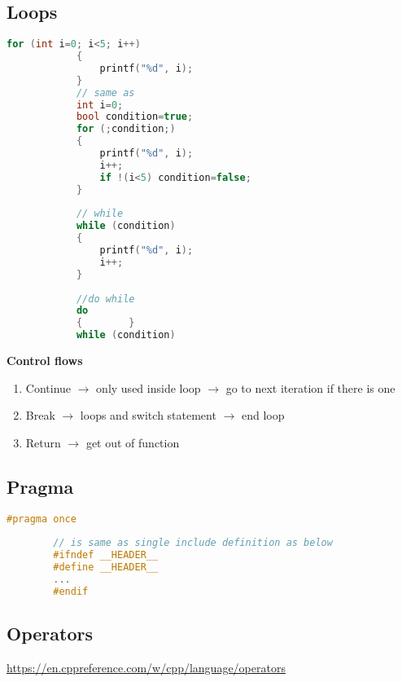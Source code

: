 \documentclass{article}
\begin{document}
        
    \subsection{Loops}
        \begin{lstlisting}[language=C++, caption= Loops example]
            for (int i=0; i<5; i++)
            {
                printf("%d", i);
            }
            // same as 
            int i=0; 
            bool condition=true;
            for (;condition;)
            {
                printf("%d", i);
                i++;
                if !(i<5) condition=false;
            }
            
            // while
            while (condition)
            {
                printf("%d", i);
                i++;
            }
            
            //do while
            do
            {        }
            while (condition)
        \end{lstlisting}
    
        \textbf{Control flows}
        \begin{enumerate}
            \item Continue $\rightarrow$ only used inside loop $\rightarrow$ go to next iteration if there is one
            \item Break $\rightarrow$ loops and switch statement $\rightarrow$ end loop
            \item Return $\rightarrow$ get out of function
        \end{enumerate}
    
    \subsection{Pragma}
        \begin{lstlisting}[language=C++]
        #pragma once 
        
        // is same as single include definition as below
        #ifndef __HEADER__
        #define __HEADER__
        ...
        #endif 
        \end{lstlisting}
    
    \subsection{Operators}
        \url{https://en.cppreference.com/w/cpp/language/operators}
    
\end{document}
